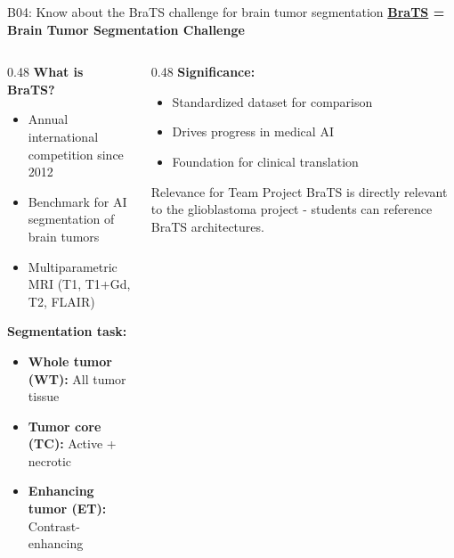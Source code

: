 \documentclass[aspectratio=169, 10pt]{beamer}
\begin{document}
\begin{frame}{B04: Know about the BraTS challenge for brain tumor segmentation}
    \textbf{\href{https://www.synapse.org/brats}{BraTS} = Brain Tumor Segmentation Challenge}

    \vspace{0.2cm}
    \begin{columns}[T]
        \begin{column}{0.48\textwidth}
            \textbf{What is BraTS?}
            \begin{itemize}
                \item Annual international competition since 2012
                \item Benchmark for AI segmentation of brain tumors
                \item Multiparametric MRI (T1, T1+Gd, T2, FLAIR)
            \end{itemize}

            \vspace{0.2cm}
            \textbf{Segmentation task:}
            \begin{itemize}
                \item \textbf{Whole tumor (WT):} All tumor tissue
                \item \textbf{Tumor core (TC):} Active + necrotic
                \item \textbf{Enhancing tumor (ET):} Contrast-enhancing
            \end{itemize}
        \end{column}
        \begin{column}{0.48\textwidth}
            \textbf{Significance:}
            \begin{itemize}
                \item Standardized dataset for comparison
                \item Drives progress in medical AI
                \item Foundation for clinical translation
            \end{itemize}

            \vspace{0.2cm}
            \begin{block}{\footnotesize Relevance for Team Project}
                \footnotesize
                BraTS is directly relevant to the glioblastoma project - students can reference BraTS architectures.
            \end{block}
        \end{column}
    \end{columns}
\end{frame}
\end{document}
